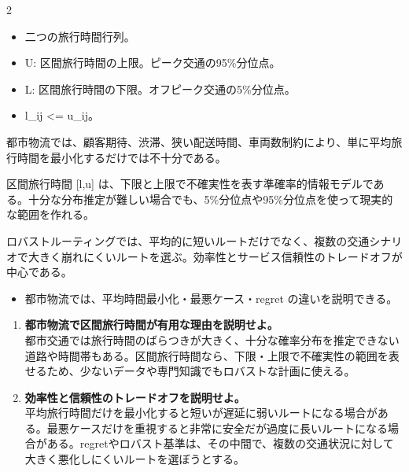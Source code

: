 \clearpage
{}
\begin{multicols}{2}\footnotesize\raggedcolumns
{}
\begin{itemize}
\item 二つの旅行時間行列。
\item U: 区間旅行時間の上限。ピーク交通の95\%分位点。
\item L: 区間旅行時間の下限。オフピーク交通の5\%分位点。
\item l\_ij <= u\_ij。
\end{itemize}
都市物流では、顧客期待、渋滞、狭い配送時間、車両数制約により、単に平均旅行時間を最小化するだけでは不十分である。\par

区間旅行時間 [l,u] は、下限と上限で不確実性を表す準確率的情報モデルである。十分な分布推定が難しい場合でも、5\%分位点や95\%分位点を使って現実的な範囲を作れる。\par

ロバストルーティングでは、平均的に短いルートだけでなく、複数の交通シナリオで大きく崩れにくいルートを選ぶ。効率性とサービス信頼性のトレードオフが中心である。\par
{}
\begin{itemize}
\item 都市物流では、平均時間最小化・最悪ケース・regret の違いを説明できる。
\end{itemize}
\begin{enumerate}
\item \textbf{都市物流で区間旅行時間が有用な理由を説明せよ。}\\都市交通では旅行時間のばらつきが大きく、十分な確率分布を推定できない道路や時間帯もある。区間旅行時間なら、下限・上限で不確実性の範囲を表せるため、少ないデータや専門知識でもロバストな計画に使える。
\item \textbf{効率性と信頼性のトレードオフを説明せよ。}\\平均旅行時間だけを最小化すると短いが遅延に弱いルートになる場合がある。最悪ケースだけを重視すると非常に安全だが過度に長いルートになる場合がある。regretやロバスト基準は、その中間で、複数の交通状況に対して大きく悪化しにくいルートを選ぼうとする。
\end{enumerate}
\end{multicols}

